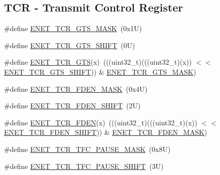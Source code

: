 \subsection*{T\+CR -\/ Transmit Control Register}
\begin{DoxyCompactItemize}
\item 
\#define \mbox{\hyperlink{group___e_n_e_t___register___masks_ga99d109b14e8bda3be968900968045b8d}{E\+N\+E\+T\+\_\+\+T\+C\+R\+\_\+\+G\+T\+S\+\_\+\+M\+A\+SK}}~(0x1\+U)
\item 
\#define \mbox{\hyperlink{group___e_n_e_t___register___masks_ga6f1db14f8c66c67580cb518d13f99cc5}{E\+N\+E\+T\+\_\+\+T\+C\+R\+\_\+\+G\+T\+S\+\_\+\+S\+H\+I\+FT}}~(0\+U)
\item 
\#define \mbox{\hyperlink{group___e_n_e_t___register___masks_gaa7c86dcad4a239749de431d47a876ba7}{E\+N\+E\+T\+\_\+\+T\+C\+R\+\_\+\+G\+TS}}(x)~(((uint32\+\_\+t)(((uint32\+\_\+t)(x)) $<$$<$ \mbox{\hyperlink{group___e_n_e_t___register___masks_ga6f1db14f8c66c67580cb518d13f99cc5}{E\+N\+E\+T\+\_\+\+T\+C\+R\+\_\+\+G\+T\+S\+\_\+\+S\+H\+I\+FT}})) \& \mbox{\hyperlink{group___e_n_e_t___register___masks_ga99d109b14e8bda3be968900968045b8d}{E\+N\+E\+T\+\_\+\+T\+C\+R\+\_\+\+G\+T\+S\+\_\+\+M\+A\+SK}})
\item 
\#define \mbox{\hyperlink{group___e_n_e_t___register___masks_gadf5843a438d25920ade38488aa66a81c}{E\+N\+E\+T\+\_\+\+T\+C\+R\+\_\+\+F\+D\+E\+N\+\_\+\+M\+A\+SK}}~(0x4\+U)
\item 
\#define \mbox{\hyperlink{group___e_n_e_t___register___masks_ga65366ef60776e87cc2a287656568fb8e}{E\+N\+E\+T\+\_\+\+T\+C\+R\+\_\+\+F\+D\+E\+N\+\_\+\+S\+H\+I\+FT}}~(2\+U)
\item 
\#define \mbox{\hyperlink{group___e_n_e_t___register___masks_ga7c4b39af12e086938bee5961e31c5622}{E\+N\+E\+T\+\_\+\+T\+C\+R\+\_\+\+F\+D\+EN}}(x)~(((uint32\+\_\+t)(((uint32\+\_\+t)(x)) $<$$<$ \mbox{\hyperlink{group___e_n_e_t___register___masks_ga65366ef60776e87cc2a287656568fb8e}{E\+N\+E\+T\+\_\+\+T\+C\+R\+\_\+\+F\+D\+E\+N\+\_\+\+S\+H\+I\+FT}})) \& \mbox{\hyperlink{group___e_n_e_t___register___masks_gadf5843a438d25920ade38488aa66a81c}{E\+N\+E\+T\+\_\+\+T\+C\+R\+\_\+\+F\+D\+E\+N\+\_\+\+M\+A\+SK}})
\item 
\#define \mbox{\hyperlink{group___e_n_e_t___register___masks_ga71a1167639f6bec0334adb16cdc8e049}{E\+N\+E\+T\+\_\+\+T\+C\+R\+\_\+\+T\+F\+C\+\_\+\+P\+A\+U\+S\+E\+\_\+\+M\+A\+SK}}~(0x8\+U)
\item 
\#define \mbox{\hyperlink{group___e_n_e_t___register___masks_ga100df2882bc10658b602c3b2f90c0ed3}{E\+N\+E\+T\+\_\+\+T\+C\+R\+\_\+\+T\+F\+C\+\_\+\+P\+A\+U\+S\+E\+\_\+\+S\+H\+I\+FT}}~(3\+U)

\end{DoxyCompactItemize}
